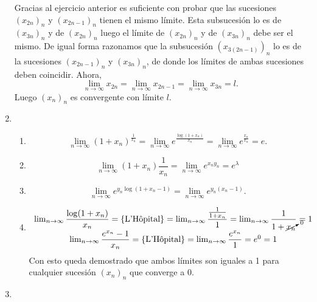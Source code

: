 \begin{enumerate}[label=\color{red}\textbf{\arabic*)}, leftmargin=*]
Gracias al ejercicio anterior es suficiente con probar que las sucesiones $(x_{2n})_n$ y $(x_{2n-1})_n$ tienen el mismo límite. Esta subsucesión lo es de $(x_{3n})_n$ y de $(x_{2n})_n$ luego el límite de $(x_{2n})_n$ y de $(x_{3n})_n$ debe ser el mismo. De igual forma razonamos que la subsucesión $(x_{3(2n-1)})_n$ lo es de la sucesiones $(x_{2n-1})_n$ y $(x_{3n})_n$, de donde los límites de ambas sucesiones deben coincidir. Ahora, \[ \lim_{n\to\infty}x_{2n}=\lim_{n\to\infty}x_{2n-1}=\lim_{n\to\infty}x_{3n}=l. \] Luego $(x_n)_n$ es convergente con límite $l$.
\item \begin{enumerate}[label=\color{red}\arabic*)]
	\item {}
	\[ \lim_{n\to\infty}(1+x_n)^{\frac{1}{x_n}}=\lim_{n\to\infty}e^{\frac{\log(1+x_n)}{x_n}}=\lim_{n\to\infty}e^{\frac{x_n}{x_n}}=e. \]
	\item {}
	\[ \lim_{n\to\infty}(1+x_n)\frac{1}{x_n} =\lim_{n\to\infty}e^{x_ny_n}=e^{\lambda}\]
	\item {}
	\[ \lim_{n\to\infty}e^{y_n\log(1+x_n-1)}=\lim_{n\to\infty}e^{y_n(x_n-1)}. \]
	\item {}
	\[ \begin{array}{c}
		\lim_{n\to\infty}\dfrac{\log(1+x_n)}{x_n}=\{\text{L'Hôpital}\}=\lim_{n\to\infty}\dfrac{\frac{1}{1+x_n}}{1}=\lim_{n\to\infty}\dfrac{1}{1+\cancelto{0}{x_n}}=1 \\
		\lim_{n\to\infty}\dfrac{e^{x_n}-1}{x_n}=\{\text{L'Hôpital}\}=\lim_{n\to\infty}\dfrac{e^{x_n}}{1}=e^0=1
	\end{array}\]
	Con esto queda demostrado que ambos límites son iguales a 1 para cualquier sucesión $(x_n)_n$ que converge a 0.
\end{enumerate}
\item {}


\end{enumerate}
